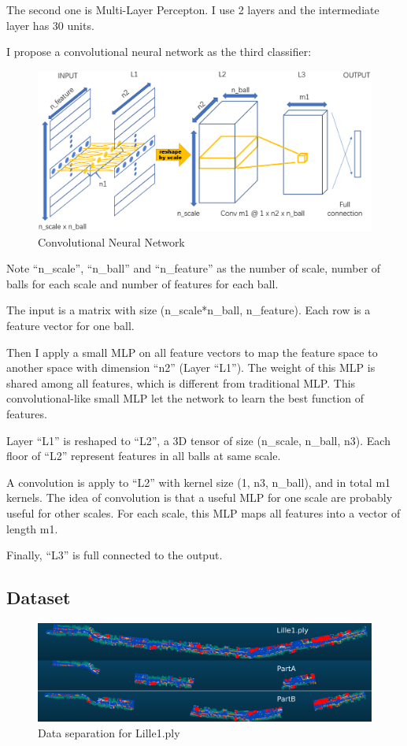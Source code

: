 \documentclass{article}
\begin{document}
The second one is Multi-Layer Percepton. I use 2 layers and the intermediate layer has 30 units. 

I propose a convolutional neural network as the third classifier:

\begin{figure}[h]
	\centering
	\includegraphics[width=12cm]{cnn.png}
	\caption{Convolutional Neural Network}
	\label{fig:cnn}
\end{figure}

Note ``n\_scale'', ``n\_ball'' and ``n\_feature'' as the number of scale, number of balls for each scale and number of features for each ball. 

The input is a matrix with size (n\_scale*n\_ball, n\_feature). Each row is a feature vector for one ball. 

Then I apply a small MLP on all feature vectors to map the feature space to another space with dimension ``n2'' (Layer ``L1''). The weight of this MLP is shared among all features, which is different from traditional MLP. This convolutional-like small MLP let the network to learn the best function of features.

Layer ``L1'' is reshaped to ``L2'', a 3D tensor of size (n\_scale, n\_ball, n3). Each floor of ``L2'' represent features in all balls at same scale.

A convolution is apply to ``L2'' with kernel size (1, n3, n\_ball), and in total m1 kernels. The idea of convolution is that a useful MLP for one scale are probably useful for other scales. For each scale, this MLP maps all features into a vector of length m1.

Finally, ``L3'' is full connected to the output.



\subsection{Dataset} \label{sec:dataset}
\begin{figure}[h]
	\centering
	\includegraphics[width=12cm]{Lille1_cut.png}
	\caption{Data separation for Lille1.ply}
	\label{fig:lill1}
\end{figure}
\end{document}
